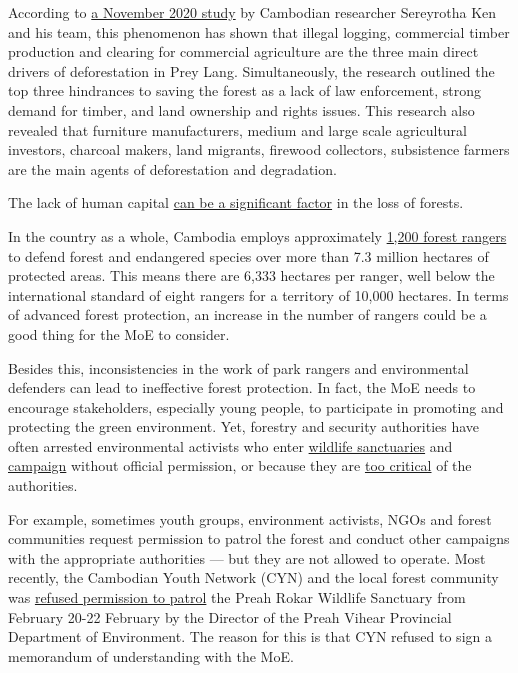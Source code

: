 \documentclass[10pt,a4paper]{letter}
\begin{document}
According to \href{https://link.springer.com/chapter/10.1007/978-3-030-62509-2_8}{a November 2020 study} by Cambodian researcher Sereyrotha Ken and his team, this phenomenon has shown that illegal logging, commercial timber production and clearing for commercial agriculture are the three main direct drivers of deforestation in Prey Lang. Simultaneously, the research outlined the top three hindrances to saving the forest as a lack of law enforcement, strong demand for timber, and land ownership and rights issues. This research also revealed that furniture manufacturers, medium and large scale agricultural investors, charcoal makers, land migrants, firewood collectors, subsistence farmers are the main agents of deforestation and degradation.

The lack of human capital \href{https://www.khmertimeskh.com/50781262/illegal-loggers-clear-30-hectares-of-forest-in-mondulkiri-province/}{can be a significant factor} in the loss of forests. 

In the country as a whole, Cambodia employs approximately \href{https://www.voacambodia.com/a/cambodia-s-rangers-risk-lives-protecting-environment/5771184.html}{1,200 forest rangers} to defend forest and endangered species over more than 7.3 million hectares of protected areas. This means there are 6,333 hectares per ranger, well below the international standard of eight rangers for a territory of 10,000 hectares. In terms of advanced forest protection, an increase in the number of rangers could be a good thing for the MoE to consider.

Besides this, inconsistencies in the work of park rangers and environmental defenders can lead to ineffective forest protection. In fact, the MoE needs to encourage stakeholders, especially young people, to participate in promoting and protecting the green environment. Yet, forestry and security authorities have often arrested environmental activists who enter \href{https://newint.org/features/2021/02/15/forest-defenders-under-fire-cambodia}{wildlife sanctuaries} and \href{https://www.rfa.org/english/news/cambodia/release-02082021175436.html}{campaign} without official permission, or because they are \href{https://www.khmertimeskh.com/50814434/supreme-court-turns-down-three-activists-bail-request/}{too critical} of the authorities.

For example, sometimes youth groups, environment activists, NGOs and forest communities request permission to patrol the forest and conduct other campaigns with the appropriate authorities --- but they are not allowed to operate. Most recently, the Cambodian Youth Network (CYN) and the local forest community was \href{https://www.facebook.com/borak.ma/posts/3268828009885906}{refused permission to patrol} the Preah Rokar Wildlife Sanctuary from February 20-22 February by the Director of the Preah Vihear Provincial Department of Environment. The reason for this is that CYN refused to sign a memorandum of understanding with the MoE.
\end{document}
